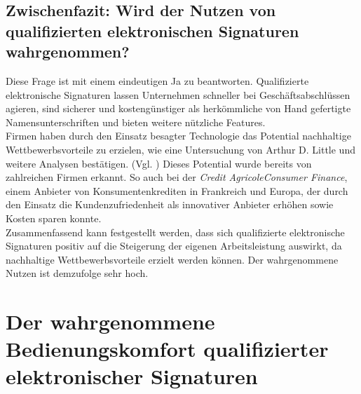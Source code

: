 \documentclass[deutsch]{lib/llncs/llncs}
\begin{document}
\subsection{Zwischenfazit: Wird der Nutzen von qualifizierten elektronischen Signaturen wahrgenommen?}
Diese Frage ist mit einem eindeutigen Ja zu beantworten. Qualifizierte elektronische Signaturen lassen Unternehmen schneller bei Geschäftsabschlüssen agieren, sind sicherer und kostengünstiger als herkömmliche von Hand gefertigte Namensunterschriften und bieten weitere nützliche Features. \\
Firmen haben durch den Einsatz besagter Technologie das Potential nachhaltige Wettbewerbsvorteile zu erzielen, wie eine Untersuchung von Arthur D. Little und weitere Analysen bestätigen. (Vgl. \cite[S. 7]{Zitat05})
Dieses Potential wurde bereits von zahlreichen Firmen erkannt. So auch bei der \textit{Credit AgricoleConsumer Finance}, einem Anbieter von Konsumentenkrediten in Frankreich und Europa, der durch den Einsatz die Kundenzufriedenheit als innovativer Anbieter erhöhen sowie Kosten sparen konnte. \cite[S. 13]{Zitat05} \\
Zusammenfassend kann festgestellt werden, dass sich qualifizierte elektronische Signaturen positiv auf die Steigerung der eigenen Arbeitsleistung auswirkt, da nachhaltige Wettbewerbsvorteile erzielt werden können. Der wahrgenommene Nutzen ist demzufolge sehr hoch. 


\section{Der wahrgenommene Bedienungskomfort qualifizierter elektronischer Signaturen}
\end{document}
